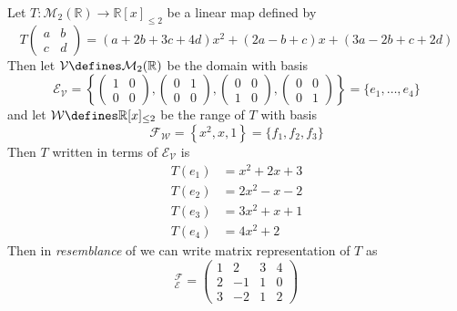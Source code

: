 \begin{exm}
	Let $T:\mathcal{M}_2({\mathbb{R}})\to\mathbb{R}[x]_{\leq2}$ be a linear map
	defined by
	\begin{equation*}
		T\begin{pmatrix}
			a & b \\
			c & d
		\end{pmatrix}=(a+2b+3c+4d)x^2 + (2a-b+c)x + (3a-2b+c+2d)
	\end{equation*}
	Then let $\mathcal{V}\defines\mathcal{M}_2({\mathbb{R}})$ be the domain with basis
	\begin{equation*}
		\mathcal{E}_\mathcal{V}=\left\{
		\begin{pmatrix}
			1 & 0 \\
			0 & 0
		\end{pmatrix},
		\begin{pmatrix}
			0 & 1 \\
			0 & 0
		\end{pmatrix},
		\begin{pmatrix}
			0 & 0 \\
			1 & 0
		\end{pmatrix},
		\begin{pmatrix}
			0 & 0 \\
			0 & 1
		\end{pmatrix}
		\right\}=\{e_1,\dots,e_4\}
	\end{equation*}
	and let $\mathcal{W}\defines\mathbb{R}[x]_{\leq2}$ be the range of $T$ with basis
	\begin{equation*}
		\mathcal{F}_\mathcal{W}=\left\{
		x^2,x,1
		\right\}=\{f_1,f_2,f_3\}
	\end{equation*}
	Then $T$ written in terms of $\mathcal{E}_\mathcal{V}$ is
	\begin{align*}
		T(e_1) & =  x^2 + 2x + 3 \\
		T(e_2) & = 2x^2 -  x - 2 \\
		T(e_3) & = 3x^2 +  x + 1 \\
		T(e_4) & = 4x^2      + 2
	\end{align*}
	Then in \textit{resemblance} of 
	we can write matrix representation of $T$ as
	\begin{equation*}
		[T]_\mathcal{E}^\mathcal{F}=\begin{pmatrix}
			1 & 2  & 3 & 4 \\
			2 & -1 & 1 & 0 \\
			3 & -2 & 1 & 2
		\end{pmatrix}
	\end{equation*}
\end{exm}

